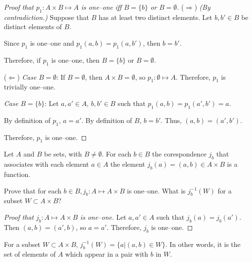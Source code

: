 \begin{proof}[Proof that $p_1 : A \times B \mapsto A$ is one--one iff $B = \{b\}$ or $B = \emptyset$]
	($\Rightarrow$) \textit{(By contradiction.)}
	Suppose that $B$ has at least two distinct elements. Let $b, b' \in B$ be distinct elements of $B$.

	Since $p_1$ is one--one and $p_1(a,b) = p_1(a,b')$, then $b = b'$. \contradiction

	Therefore, if $p_1$ is one--one, then $B = \{b\}$ or $B = \emptyset$.

	($\Leftarrow$) \textit{Case $B = \emptyset$}:
	If $B = \emptyset$, then $A \times B = \emptyset$, so $p_1 : \emptyset \mapsto A$.
	Therefore, $p_1$ is trivially one--one.

	\textit{Case $B = \{b\}$}:
	Let $a,a' \in A$, $b,b' \in B$ such that $p_1(a,b) = p_1(a',b') = a$.

	By definition of $p_1$, $a = a'$. By definition of $B$, $b = b'$.
	Thus, $(a,b) = (a',b')$.

	Therefore, $p_1$ is one--one.
\end{proof}

\begin{problem}
	Let $A$ and $B$ be sets, with $B \neq \emptyset$.
	For each $b \in B$ the corespondence $j_b$ that associates with each element $a \in A$ the element $j_b(a) = (a,b) \in A \times B$ is a function.

	Prove that for each $b \in B, j_b : A \mapsto A \times B$ is one--one.
	What is $j_b^{-1}(W)$ for a subset $W \subset A \times B$?
\end{problem}

\begin{proof}[Proof that $j_b : A \mapsto A \times B$ is one--one]
	Let $a,a' \in A$ such that $j_b(a) = j_b(a')$.
	Then $(a,b) = (a',b)$, so $a = a'$.
	Therefore, $j_b$ is one--one.
\end{proof}

For a subset $W \subset A \times B$, $j_b^{-1}(W) = \{a | (a,b) \in W \}$.
In other words, it is the set of elements of $A$ which appear in a pair with $b$ in $W$.
